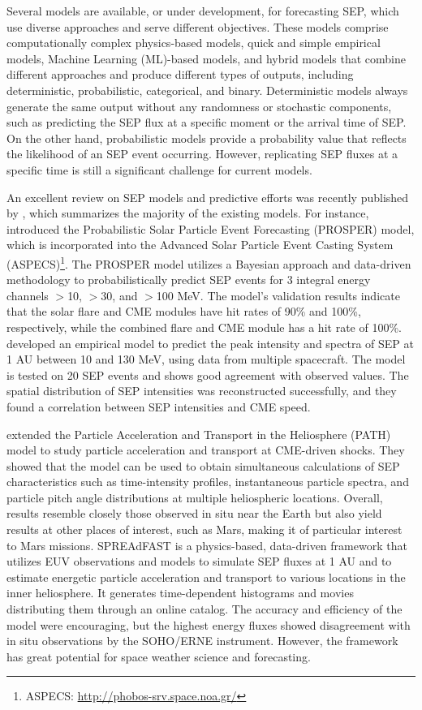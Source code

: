 Several models are available, or under development, for forecasting SEP, which use diverse approaches and serve different objectives. These models comprise computationally complex physics-based models, quick and simple empirical models, Machine Learning (ML)-based models, and hybrid models that combine different approaches and produce different types of outputs, including deterministic, probabilistic, categorical, and binary. Deterministic models always generate the same output without any randomness or stochastic components, such as predicting the SEP flux at a specific moment or the arrival time of SEP. On the other hand, probabilistic models provide a probability value that reflects the likelihood of an SEP event occurring. However, replicating SEP fluxes at a specific time is still a significant challenge for current models.

An excellent review on SEP models and predictive efforts was recently published by \citet{whitman_2022}, which summarizes the majority of the existing models.
For instance, \citet{papaioannou_2022} introduced the Probabilistic Solar Particle Event Forecasting (PROSPER) model, which is incorporated into the Advanced Solar Particle Event Casting System (ASPECS)\footnote{ASPECS: \url{http://phobos-srv.space.noa.gr/}}. The PROSPER model utilizes a Bayesian approach and data-driven methodology to probabilistically predict SEP events for 3 integral energy channels $>$10, $>$30, and $>$100 MeV. The model's validation results indicate that the solar flare and CME modules have hit rates of 90\% and 100\%, respectively, while the combined flare and CME module has a hit rate of 100\%.
\citet{bruno_2021} developed an empirical model to predict the peak intensity and spectra of SEP at 1 AU between 10 and 130 MeV, using data from multiple spacecraft. The model is tested on 20 SEP events and shows good agreement with observed values. The spatial distribution of SEP intensities was reconstructed successfully, and they found a correlation between SEP intensities and CME speed.

\citet{hu_2017} extended the Particle Acceleration and Transport in the Heliosphere (PATH) model to study particle acceleration and transport at CME-driven shocks. They showed that the model can be used to obtain simultaneous calculations of SEP characteristics such as time-intensity profiles, instantaneous particle spectra, and particle pitch angle distributions at multiple heliospheric locations. Overall, results resemble closely those observed in situ near the Earth but also yield results at other places of interest, such as Mars, making it of particular interest to Mars missions.
SPREAdFAST \citep{kozarev_2017, kozarev_2022} is a physics-based, data-driven framework that utilizes EUV observations and models to simulate SEP fluxes at 1 AU and to estimate energetic particle acceleration and transport to various locations in the inner heliosphere. It generates time-dependent histograms and movies distributing them through an online catalog. The accuracy and efficiency of the model were encouraging, but the highest energy fluxes showed disagreement with in situ observations by the SOHO/ERNE instrument. However, the framework has great potential for space weather science and forecasting.

